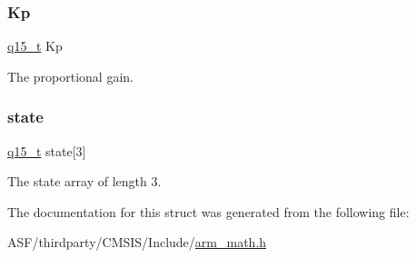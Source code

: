 \subsubsection{\texorpdfstring{Kp}{Kp}}
{\footnotesize\ttfamily \mbox{\hyperlink{arm__math_8h_ab5a8fb21a5b3b983d5f54f31614052ea}{q15\+\_\+t}} Kp}

The proportional gain. \mbox{\label{structarm__pid__instance__q15_a4c4e19d77015f5f7a31a1daf0faf31b6}} 
\subsubsection{\texorpdfstring{state}{state}}
{\footnotesize\ttfamily \mbox{\hyperlink{arm__math_8h_ab5a8fb21a5b3b983d5f54f31614052ea}{q15\+\_\+t}} state\mbox{[}3\mbox{]}}

The state array of length 3. 

The documentation for this struct was generated from the following file\+:\begin{DoxyCompactItemize}
\item 
A\+S\+F/thirdparty/\+C\+M\+S\+I\+S/\+Include/\mbox{\hyperlink{arm__math_8h}{arm\+\_\+math.\+h}}\end{DoxyCompactItemize}
